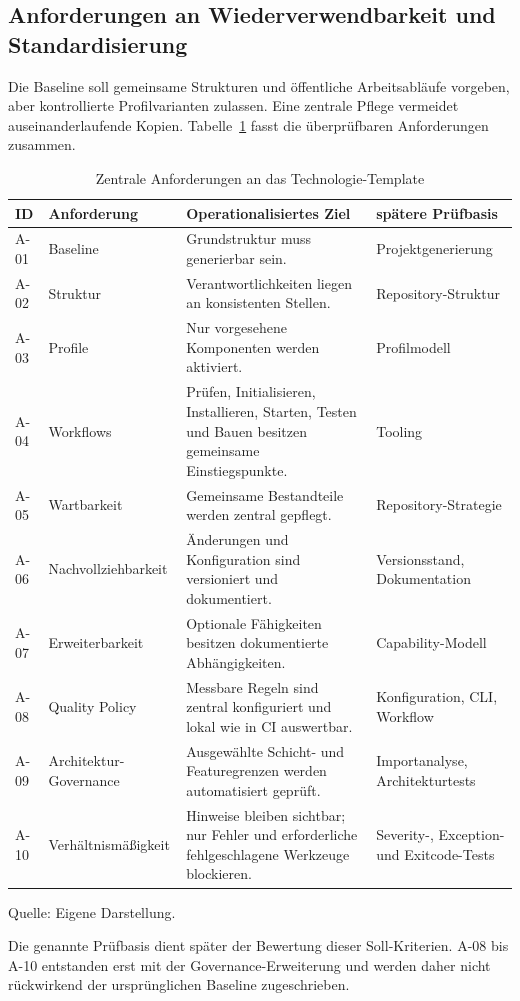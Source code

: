 \subsection{Anforderungen an Wiederverwendbarkeit und Standardisierung}
\label{subsec:wiederverwendbarkeit-standardisierung}

Die Baseline soll gemeinsame Strukturen und öffentliche Arbeitsabläufe
vorgeben, aber kontrollierte Profilvarianten zulassen. Eine zentrale Pflege
vermeidet auseinanderlaufende Kopien. Tabelle~\ref{tab:anforderungen-template}
fasst die überprüfbaren Anforderungen zusammen.

\begin{table}[H]
  \centering
  \scriptsize
  \renewcommand{\arraystretch}{1.08}
  \caption{Zentrale Anforderungen an das Technologie-Template}
  \label{tab:anforderungen-template}
  \begin{tabularx}{\textwidth}{@{}p{}p{}p{}>{\raggedright\arraybackslash}X@{}}
    \toprule
    \textbf{ID} & \textbf{Anforderung} & \textbf{Operationalisiertes Ziel} & \textbf{spätere Prüfbasis} \\
    \midrule
    A-01 & Baseline & Grundstruktur muss generierbar sein. & Projektgenerierung \\
    A-02 & Struktur & Verantwortlichkeiten liegen an konsistenten Stellen. & Repository-Struktur \\
    A-03 & Profile & Nur vorgesehene Komponenten werden aktiviert. & Profilmodell \\
    A-04 & Workflows & Prüfen, Initialisieren, Installieren, Starten, Testen und Bauen besitzen gemeinsame Einstiegspunkte. & Tooling \\
    A-05 & Wartbarkeit & Gemeinsame Bestandteile werden zentral gepflegt. & Repository-Strategie \\
    A-06 & Nachvollziehbarkeit & Änderungen und Konfiguration sind versioniert und dokumentiert. & Versionsstand, Dokumentation \\
    A-07 & Erweiterbarkeit & Optionale Fähigkeiten besitzen dokumentierte Abhängigkeiten. & Capability-Modell \\
    A-08 & Quality Policy & Messbare Regeln sind zentral konfiguriert und lokal wie in CI auswertbar. & Konfiguration, CLI, Workflow \\
    A-09 & Architektur-Governance & Ausgewählte Schicht- und Featuregrenzen werden automatisiert geprüft. & Importanalyse, Architekturtests \\
    A-10 & Verhältnismäßigkeit & Hinweise bleiben sichtbar; nur Fehler und erforderliche fehlgeschlagene Werkzeuge blockieren. & Severity-, Exception- und Exitcode-Tests \\
    \bottomrule
  \end{tabularx}
  \smallskip
  {\footnotesize Quelle: Eigene Darstellung.\par}
\end{table}

Die genannte Prüfbasis dient später der Bewertung dieser Soll-Kriterien. A-08
bis A-10 entstanden erst mit der Governance-Erweiterung und werden daher nicht
rückwirkend der ursprünglichen Baseline zugeschrieben.
